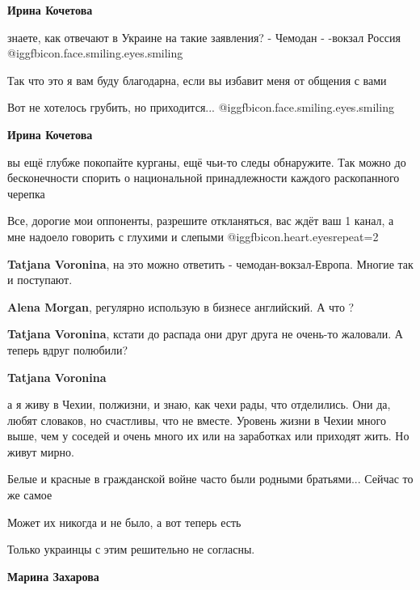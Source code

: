 \begin{itemize}
\begin{itemize}
\textbf{Ирина Кочетова} 

знаете, как отвечают в Украине на такие заявления? - Чемодан - -вокзал Россия
@igg{fbicon.face.smiling.eyes.smiling} 

Так что это я вам буду благодарна, если вы избавит меня от общения с вами

Вот не хотелось грубить, но приходится...
@igg{fbicon.face.smiling.eyes.smiling} 

\textbf{Ирина Кочетова} 

вы ещё глубже покопайте курганы, ещё чьи-то следы обнаружите. Так можно до
бесконечности спорить о национальной принадлежности каждого раскопанного
черепка


Все, дорогие мои оппоненты, разрешите откланяться, вас ждёт ваш 1 канал, а мне
надоело говорить с глухими и слепыми @igg{fbicon.heart.eyes}{repeat=2} 

\textbf{Tatjana Voronina}, на это можно ответить - чемодан-вокзал-Европа. Многие так и поступают.

\textbf{Alena Morgan}, регулярно использую в бизнесе английский. А что ?

\textbf{Tatjana Voronina}, кстати до распада они друг друга не очень-то жаловали. А теперь вдруг полюбили?

\textbf{Tatjana Voronina} 

а я живу в Чехии, полжизни, и знаю, как чехи рады, что отделились. Они да,
любят словаков, но счастливы, что не вместе. Уровень жизни в Чехии много выше,
чем у соседей и очень много их или на заработках или приходят жить. Но живут
мирно.

\end{itemize} %


Белые и красные в гражданской войне часто были родными братьями... Сейчас то же
самое


Может их никогда и не было, а вот теперь есть


Только украинцы с этим решительно не согласны.

\begin{itemize} %
\textbf{Марина Захарова} 


\end{itemize}
\end{itemize}
